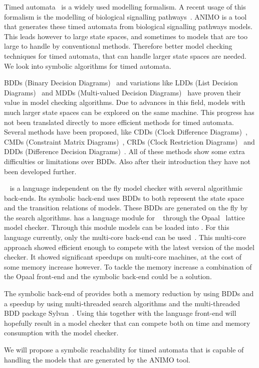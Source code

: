 Timed automata~\cite{Alur1994183} is a widely used modelling formalism. A recent usage of this formalism is the modelling of biological signalling pathways~\cite{DBLP:conf/bibe/SchivoSWCVKLPP12}. ANIMO is a tool that generates these timed automata from biological signalling pathways models. This leads however to large state spaces, and sometimes to models that are too large to handle by conventional methods. Therefore better model checking techniques for timed automata, that can handle larger state spaces are needed. We look into symbolic algorithms for timed automata.

BDDs (Binary Decision Diagrams)~\cite{Akers:1978:BDD:1310167.1310815,1676819} and variations like LDDs (List Decision Diagrams)~\cite{so62465} and MDDs (Multi-valued Decision Diagrams)~\cite{129849} have proven their value in model checking algorithms. Due to advances in this field, models with much larger state spaces can be explored on the same machine. This progress has not been translated directly to more efficient methods for timed automata. Several methods have been proposed, like CDDs (Clock Difference Diagrams)~\cite{BRICS19491}, CMDs (Constraint Matrix Diagrams)~\cite{5702245}, CRDs (Clock Restriction Diagrams)~\cite{crds} and DDDs (Difference Decision Diagrams)~\cite{ddds, ddd-datastructure-99}. All of these methods show some extra difficulties or limitations over BDDs. Also after their introduction they have not been developed further.

\ltsmin{}~\cite{eemcs18152,ltsmin-mc:nmf2011} is a language independent on the fly model checker with several algorithmic back-ends. Its symbolic back-end uses BDDs to both represent the state space and the transition relations of models. These BDDs are generated on the fly by the search algorithms. \ltsmin{} has a language module for \uppaal{}~\cite{UPPAAL} through the Opaal~\cite{opaal} lattice model checker. Through this module \uppaal{} models can be loaded into \ltsmin{}. For this language currently, only the multi-core back-end can be used~\cite{eemcs21972}. This multi-core approach showed efficient enough to compete with the latest version of the \uppaal{} model checker. It showed significant speedups on multi-core machines, at the cost of some memory increase however. To tackle the memory increase a combination of the Opaal front-end and the symbolic back-end could be a solution.

The symbolic back-end of \ltsmin{} provides both a memory reduction by using BDDs and a speedup by using multi-threaded search algorithms and the multi-threaded BDD package Sylvan~\cite{sylvan}. Using this together with the \uppaal{} language front-end will hopefully result in a model checker that can compete both on time and memory consumption with the \uppaal{} model checker.

We will propose a symbolic reachability for timed automata that is capable of handling the models that are generated by the ANIMO tool.